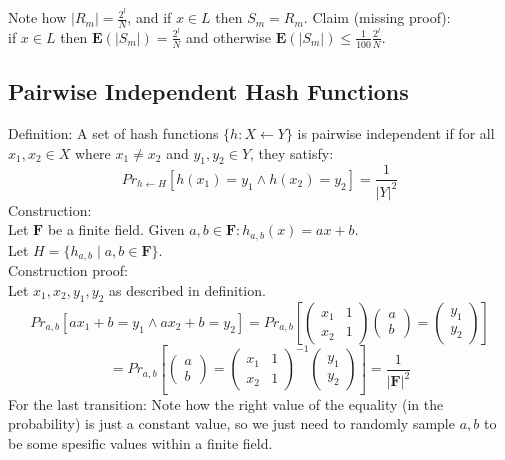 Note how $|R_m|=\frac{2^l}{N}$, and if $x\in L$ then $S_m=R_m$.
Claim (missing proof):\\%
if $x\in L$ then $\mathbf{E}(|S_m|)=\frac{2^l}{N}$ and otherwise $\mathbf{E}(|S_m|)\leq \frac{1}{100}\frac{2^l}{N}$.\\

\subsection{Pairwise Independent Hash Functions}
Definition:
A set of hash functions $\{h:X\leftarrow Y\}$ is pairwise independent if for all $x_1, x_2\in X$ where $x_1\neq x_2$ and $y_1,y_2\in Y$, they satisfy:
\[Pr_{h\leftarrow H}[h(x_1)=y_1\wedge h(x_2)=y_2]=\frac{1}{|Y|^2}\]
Construction:\\
Let $\mathbf{F}$ be a finite field.
Given $a,b\in\mathbf{F}: h_{a,b}(x)=ax+b$.\\
Let $H=\{h_{a,b}\mid a,b\in\mathbf{F}\}$.\\
Construction proof:\\
Let $x_1,x_2,y_1,y_2$ as described in definition.\\
\[
    Pr_{a,b}[ax_1+b=y_1\wedge ax_2+b=y_2]
    =Pr_{a,b}[
\begin{pmatrix}
x_1 & 1\\
x_2 & 1
\end{pmatrix}
\begin{pmatrix}
a\\
b
\end{pmatrix}
=
\begin{pmatrix}
y_1\\
y_2
\end{pmatrix}
]\]
\[
 =Pr_{a,b}[
\begin{pmatrix}
a\\
b
\end{pmatrix}
=
\begin{pmatrix}
x_1 & 1\\
x_2 & 1
\end{pmatrix}^{-1}
\begin{pmatrix}
y_1\\
y_2
\end{pmatrix}
]=\frac{1}{|\mathbf{F}|^2}\]
For the last transition: Note how the right value of the equality (in the probability) is just a constant value, so we just need to randomly sample $a,b$ to be some spesific values within a finite field.
